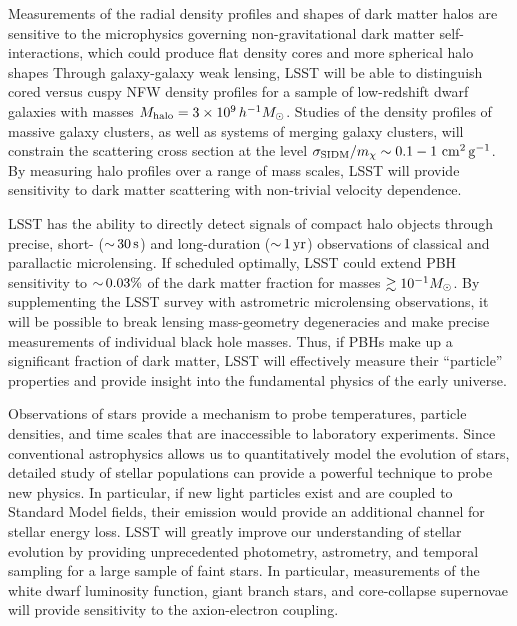 \documentclass[12pt]{article}
\begin{document}
Measurements of the radial density profiles and shapes of dark matter halos are sensitive to the microphysics governing non-gravitational dark matter self-interactions, which could produce flat density cores \citep{Spergel:1999mh} and more spherical halo shapes \citep{Peter:2013}
Through galaxy-galaxy weak lensing, LSST will be able to distinguish cored versus cuspy NFW density profiles for a sample of low-redshift dwarf galaxies with masses $M_\text{halo} = 3\times10^9\,h^{-1}M_\odot$.
Studies of the density profiles of massive galaxy clusters, as well as systems of merging galaxy clusters, will constrain the scattering cross section at the level $\sigma_{\rm SIDM}/m_\chi \sim 0.1-1 \mathrm{\,\mathrm{\,cm}^2\mathrm{\,g}^{-1}}$.
By measuring halo profiles over a range of mass scales, LSST will provide sensitivity to dark matter scattering with non-trivial velocity dependence.

LSST has the ability to directly detect signals of compact halo objects through precise, short- ($ {\sim}\, 30 \mathrm{\,s}$) and long-duration ($ {\sim}\,1 \mathrm{\,yr}$) observations of classical and parallactic microlensing\citep{1509.04899}.
If scheduled optimally, LSST could extend PBH sensitivity to $ {\sim}\,0.03\%$ of the dark matter fraction for masses $\gtrsim 10^{-1} M_\odot$.
By supplementing the LSST survey with astrometric microlensing observations, it will be possible to break lensing mass-geometry degeneracies and make precise measurements of individual black hole masses. Thus, if PBHs make up a significant fraction of dark matter, LSST will effectively measure their ``particle'' properties and provide insight into the fundamental physics of the early universe.


Observations of stars provide a mechanism to probe temperatures, particle densities, and time scales that are inaccessible to laboratory experiments. Since conventional astrophysics allows us to quantitatively model the evolution of stars, detailed study of stellar populations can provide a powerful technique to probe new physics. In particular, if new light particles exist and are coupled to Standard Model fields, their emission would provide an additional channel for stellar energy loss. 
LSST will greatly improve our understanding of stellar evolution by providing unprecedented photometry, astrometry, and temporal sampling for a large sample of faint stars. In particular, measurements of the white dwarf luminosity function, giant branch stars, and core-collapse supernovae will provide sensitivity to the axion-electron coupling.
\end{document}
